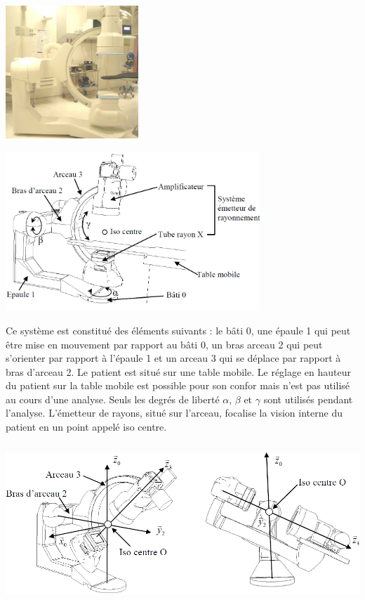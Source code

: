 \documentclass[11pt,oneside]{article}
\begin{document}
{\begin{minipage}[c]{.4\linewidth}
\begin{center}
\includegraphics[height=5cm]{png/exo3_2}
\end{center}
\end{minipage}\hfill
\begin{minipage}[c]{.55\linewidth}
\begin{center}
\includegraphics[height=6cm]{png/exo3_3}
\end{center}
\end{minipage}

\vspace{.25cm}

Ce système est constitué des éléments suivants : le bâti 0, une épaule 1 qui peut être mise en mouvement par rapport au bâti 0, un bras arceau 2 qui peut s'orienter par rapport à l'épaule 1 et un arceau 3 qui se déplace par rapport à bras d'arceau 2. Le patient est situé sur une table mobile. Le réglage en hauteur du patient sur la table mobile est possible pour son confor mais n'est pas utilisé au cours d'une analyse. Seuls les degrés de liberté $\alpha$, $\beta$ et $\gamma$ sont utilisés pendant l'analyse. L'émetteur de rayons, situé sur l'arceau, focalise la vision interne du patient en un point appelé iso centre.

\begin{center}
\includegraphics[height=6cm]{png/exo3_4}
\end{center}

}
\end{document}
